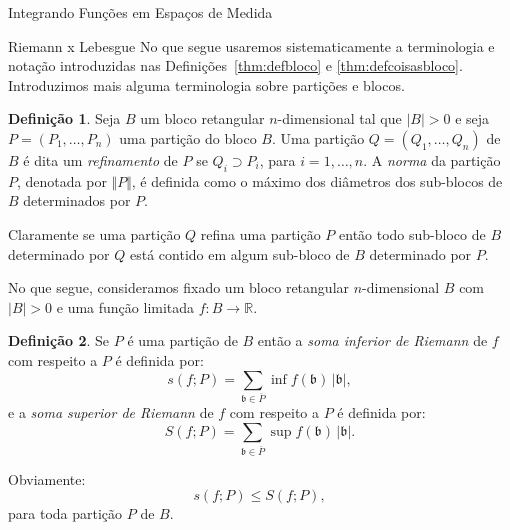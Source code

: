 \documentclass[oneside,final,11pt]{amsbook}
\newcommand{\R}{\mathds R}
\theoremstyle{remark}\newtheorem{exercise}{Exercício}[chapter]
\theoremstyle{remark}\newtheorem{*exercise}[exercise]{\hbox to 0pt{\hskip 0pt minus 1fil*}Exercício}
\theoremstyle{definition}\newtheorem{exdefin}{Definição}[chapter]
\theoremstyle{plain}\newtheorem{teo}{Teorema}[section]
\theoremstyle{plain}\newtheorem{lem}[teo]{Lema}
\theoremstyle{plain}\newtheorem{prop}[teo]{Proposição}
\theoremstyle{plain}\newtheorem{cor}[teo]{Corolário}
\theoremstyle{definition}\newtheorem{defin}[teo]{Definição}
\theoremstyle{remark}\newtheorem{rem}[teo]{Observação}
\theoremstyle{definition}\newtheorem{notation}[teo]{Notação}
\theoremstyle{definition}\newtheorem{convention}[teo]{Convenção}
\theoremstyle{definition}\newtheorem{example}[teo]{Exemplo}
\numberwithin{section}{chapter}
\numberwithin{equation}{section}
\begin{document}
\begin{chapter}{Integrando Funções em Espaços de Medida}
\begin{section}{Riemann x Lebesgue}
No que segue usaremos sistematicamente a terminologia e notação introduzidas nas Definições~\ref{thm:defbloco}
e \ref{thm:defcoisasbloco}. Introduzimos mais alguma terminologia sobre partições e blocos.
\begin{defin}
Seja $B$ um bloco retangular $n$-dimensional tal que $\vert B\vert>0$ e seja $P=(P_1,\ldots,P_n)$ uma partição
do bloco $B$. Uma partição $Q=(Q_1,\ldots,Q_n)$ de $B$ é dita um
{\em refinamento\/}
de $P$ se $Q_i\supset P_i$, para $i=1,\ldots,n$.
A {\em norma\/}
da partição $P$, denotada por $\Vert P\Vert$,
é definida como o máximo dos diâmetros dos sub-blocos de $B$ determinados por $P$.
\end{defin}
Claramente se uma partição $Q$ refina uma partição $P$ então todo sub-bloco de $B$ determinado
por $Q$ está contido em algum sub-bloco de $B$ determinado por $P$.

No que segue, consideramos fixado um bloco retangular $n$-dimensional $B$ com $\vert B\vert>0$
e uma função limitada $f:B\to\R$.
\begin{defin}
Se $P$ é uma partição de $B$ então a
{\em soma inferior de Riemann\/}
de $f$ com respeito
a $P$ é definida por:
\[s(f;P)=\sum_{\mathfrak b\in\overline P}\inf f(\mathfrak b)\,\vert\mathfrak b\vert,\]
e a {\em soma superior de Riemann\/}
de $f$ com respeito a $P$ é definida por:
\[S(f;P)=\sum_{\mathfrak b\in\overline P}\sup f(\mathfrak b)\,\vert\mathfrak b\vert.\]
\end{defin}

Obviamente:
\begin{equation}\label{eq:sleSP}
s(f;P)\le S(f;P),
\end{equation}
para toda partição $P$ de $B$.


\end{section}
\end{chapter}
\end{document}
